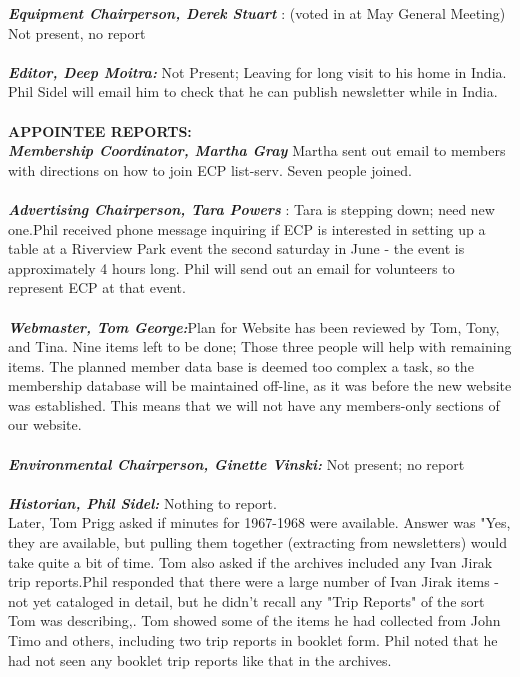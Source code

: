 \documentclass[10pt,a4paper]{article}
\begin{document}
\begin{multicols}{2}
\textit{\textbf{Equipment Chairperson, Derek Stuart}} :  (voted in at May General Meeting)
  Not present, no report\\
  \\
\textit{\textbf{Editor, Deep Moitra:}} Not Present; Leaving for long visit to his home in India.
  Phil Sidel will email him to check that he can publish newsletter while in India.\\
  \\
\textbf{APPOINTEE REPORTS:}\\
\textit{\textbf{Membership Coordinator, Martha Gray}}
Martha sent out email to members with directions on how to join ECP list-serv. Seven people joined.\\
\\
\textit{\textbf{Advertising Chairperson, Tara Powers}} :  Tara is stepping down; need new one.Phil received phone message inquiring if ECP is interested in setting up a table at a Riverview Park event the second saturday in June - the event is approximately 4 hours long.  Phil will send out an email for volunteers to represent ECP at that event.\\
\\
\textit{\textbf{Webmaster, Tom George:}}Plan for Website has been reviewed by Tom, Tony, and Tina.  Nine items left to be done; Those three people will help with remaining items. The planned member data base is deemed too complex a task, so the membership database will be maintained off-line, as it was before the new website was established.  This means that we will not have any members-only  sections of our website.\\
\\
\textit{\textbf{Environmental Chairperson, Ginette Vinski:}} Not present; no report \\
\\
\textit{\textbf{Historian, Phil Sidel:}} Nothing to report.\\
Later, Tom Prigg asked if minutes for 1967-1968 were available.  Answer was "Yes, they are available, but pulling them together (extracting from newsletters) would take quite a bit of time.  Tom also asked if the archives included any Ivan Jirak trip reports.Phil responded that there were a large number of Ivan Jirak items - not yet cataloged in detail, but he didn't recall any "Trip Reports" of the sort Tom was describing,.  Tom showed some of the items he had collected from John Timo and others, including two trip reports in booklet form.  Phil noted that he had not seen any booklet trip reports like that in the archives.

\end{multicols}
\end{document}
